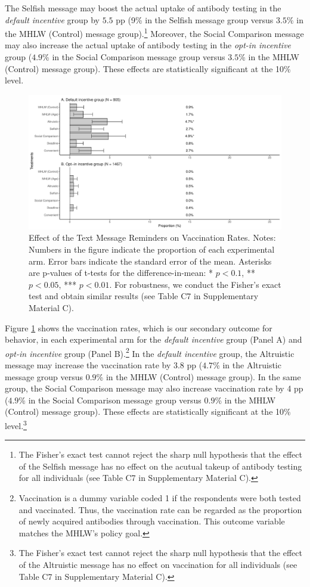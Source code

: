 \documentclass[
  11pt,
  a4paper
]{article}
\begin{document}
The Selfish message may boost the actual uptake of antibody testing in the \emph{default incentive} group by \(5.5\) pp (9\% in the Selfish message group versus \(3.5\)\% in the MHLW (Control) message group).\footnote{The Fisher's exact test cannot reject the sharp null hypothesis that the effect of the Selfish message has no effect on the acutual takeup of antibody testing for all individuals (see Table C7 in Supplementary Material C).} Moreover, the Social Comparison message may also increase the actual uptake of antibody testing in the \emph{opt-in incentive} group (\(4.9\)\% in the Social Comparison message group versus \(3.5\)\% in the MHLW (Control) message group). These effects are statistically significant at the 10\% level.

\begin{figure}[t]
\includegraphics{Main-Document-LaTeX_files/figure-latex/ttest-act-vacc-1} \caption{Effect of the Text Message Reminders on Vaccination Rates. Notes: Numbers in the figure indicate the proportion of each experimental arm. Error bars indicate the standard error of the mean. Asterisks are p-values of t-tests for the difference-in-mean: * $p < 0.1$, ** $p < 0.05$, *** $p < 0.01$. For robustness, we conduct the Fisher's exact test and obtain similar results (see Table C7 in Supplementary Material C).}\label{fig:ttest-act-vacc}
\end{figure}

Figure \ref{fig:ttest-act-vacc} shows the vaccination rates, which is our secondary outcome for behavior, in each experimental arm for the \emph{default incentive} group (Panel A) and \emph{opt-in incentive} group (Panel B).\footnote{Vaccination is a dummy variable coded 1 if the respondents were both tested and vaccinated. Thus, the vaccination rate can be regarded as the proportion of newly acquired antibodies through vaccination. This outcome variable matches the MHLW's policy goal.} In the \emph{default incentive} group, the Altruistic message may increase the vaccination rate by \(3.8\) pp (\(4.7\)\% in the Altruistic message group versus \(0.9\)\% in the MHLW (Control) message group). In the same group, the Social Comparison message may also increase vaccination rate by 4 pp (\(4.9\)\% in the Social Comparison message group versus \(0.9\)\% in the MHLW (Control) message group). These effects are statistically significant at the 10\% level.\footnote{The Fisher's exact test cannot reject the sharp null hypothesis that the effect of the Altruistic message has no effect on vaccination for all individuals (see Table C7 in Supplementary Material C).}
\end{document}
